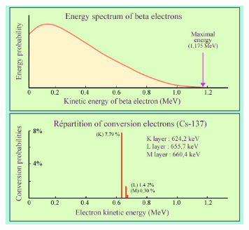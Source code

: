 \begin{figure}
  \centering
  \includegraphics[width=9cm]{timedifference/fig_timediff/SpectreBeta_Cs137.jpg}
  \caption{\label{fig:Tl_IC}}

\end{figure}
